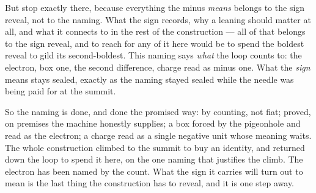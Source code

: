 But stop exactly there, because everything the minus \emph{means} belongs to the sign reveal, not to the naming.
What the sign records, why a leaning should matter at all, and what it connects to in the rest of the
construction --- all of that belongs to the sign reveal, and to reach for any of it here would be to spend the
boldest reveal to gild its second-boldest. This naming says \emph{what} the loop counts to: the
electron, box one, the second difference, charge read as minus one. What the \emph{sign} means stays sealed,
exactly as the naming stayed sealed while the needle was being paid for at the summit.

So the naming is done, and done the promised way: by counting, not fiat; proved, on premises the machine
honestly supplies; a box forced by the pigeonhole and read as the electron; a charge read as a single negative
unit whose meaning waits. The whole construction climbed to the summit to buy an identity, and returned down the
loop to spend it here, on the one naming that justifies the climb. The electron has been named by the count. What
the sign it carries will turn out to mean is the last thing the construction has to reveal, and it is one step away.
